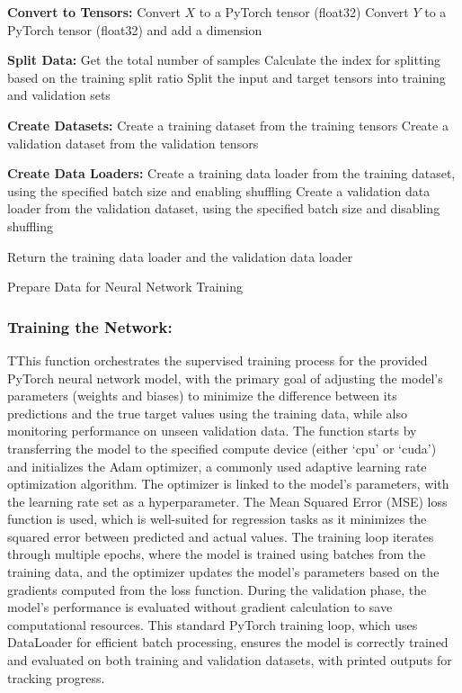 \documentclass{article}
\begin{document}
\begin{algorithm}[H]
\SetAlgoLined %

\textbf{Convert to Tensors:}\;
Convert \(X\) to a PyTorch tensor (float32)\;
Convert \(Y\) to a PyTorch tensor (float32) and add a dimension\;

\textbf{Split Data:}\;
Get the total number of samples\;
Calculate the index for splitting based on the training split ratio\;
Split the input and target tensors into training and validation sets\;

\textbf{Create Datasets:}\;
Create a training dataset from the training tensors\;
Create a validation dataset from the validation tensors\;

\textbf{Create Data Loaders:}\;
Create a training data loader from the training dataset, using the specified batch size and enabling shuffling\;
Create a validation data loader from the validation dataset, using the specified batch size and disabling shuffling\;

Return the training data loader and the validation data loader\;

\caption{Prepare Data for Neural Network Training}
\label{alg:prepare_data} %
\end{algorithm}





\subsubsection{Training the Network:}

TThis function orchestrates the supervised training process for the provided PyTorch neural network model, with the primary goal of adjusting the model’s parameters (weights and biases) to minimize the difference between its predictions and the true target values using the training data, while also monitoring performance on unseen validation data. The function starts by transferring the model to the specified compute device (either ‘cpu’ or ‘cuda’) and initializes the Adam optimizer, a commonly used adaptive learning rate optimization algorithm. The optimizer is linked to the model's parameters, with the learning rate set as a hyperparameter. The Mean Squared Error (MSE) loss function is used, which is well-suited for regression tasks as it minimizes the squared error between predicted and actual values. The training loop iterates through multiple epochs, where the model is trained using batches from the training data, and the optimizer updates the model’s parameters based on the gradients computed from the loss function. During the validation phase, the model’s performance is evaluated without gradient calculation to save computational resources. This standard PyTorch training loop, which uses DataLoader for efficient batch processing, ensures the model is correctly trained and evaluated on both training and validation datasets, with printed outputs for tracking progress.\\
\end{document}

